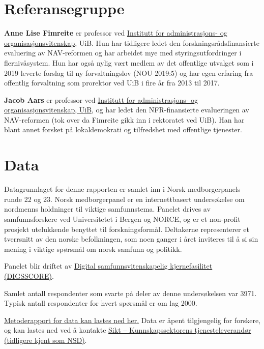 \documentclass[
]{book}
\begin{document}
\hypertarget{referansegruppe}{%
\section{Referansegruppe}\label{referansegruppe}}

\textbf{Anne Lise Fimreite} er professor ved \href{https://www.uib.no/personer/Anne.Lise.Fimreite}{Institutt for administrasjons- og organisasjonsvitenskap}, UiB.
Hun har tidligere ledet den forskningsrådsfinansierte evaluering av NAV-reformen og har arbeidet mye med styringsutfordringer i flernivåsystem.
Hun har også nylig vært medlem av det offentlige utvalget som i 2019 leverte forslag til ny forvaltningslov (NOU 2019:5) og har egen erfaring fra offentlig forvaltning som prorektor ved UiB i fire år fra 2013 til 2017.

\textbf{Jacob Aars} er professor ved \href{https://www.uib.no/personer/Jacob.Aars}{Institutt for administrasjons- og organisasjonsvitenskap, UiB}, og har ledet den NFR-finansierte evalueringen av NAV-reformen (tok over da Fimreite gikk inn i rektoratet ved UiB).
Han har blant annet forsket på lokaldemokrati og tilfredshet med offentlige tjenester.

\hypertarget{data}{%
\section{Data}\label{data}}

Datagrunnlaget for denne rapporten er samlet inn i Norsk medborgerpanels runde 22 og 23.
Norsk medborgerpanel er en internettbasert undersøkelse om nordmenns holdninger til viktige samfunnstema.
Panelet drives av samfunnsforskere ved Universitetet i Bergen og NORCE, og er et non-profit prosjekt utelukkende benyttet til forskningsformål.
Deltakerne representerer et tverrsnitt av den norske befolkningen, som noen ganger i året inviteres til å si sin mening i viktige spørsmål om norsk samfunn og politikk.

Panelet blir driftet av \href{www.digsscore.uib.no}{Digital samfunnsvitenskapelig kjernefasilitet (DIGSSCORE)}.

Samlet antall respondenter som svarte på deler av denne undersøkelsen var 3971.
Typisk antall respondenter for hvert spørsmål er om lag 2000.

\href{https://www.uib.no/en/digsscore/122162/methodology-and-field-periods}{Metoderapport for data kan lastes ned her.}
Data er åpent tilgjengelig for forskere, og kan lastes ned ved å kontakte \href{https://sikt.no/}{Sikt -- Kunnskapssektorens tjenesteleverandør (tidligere kjent som NSD)}.
\end{document}
